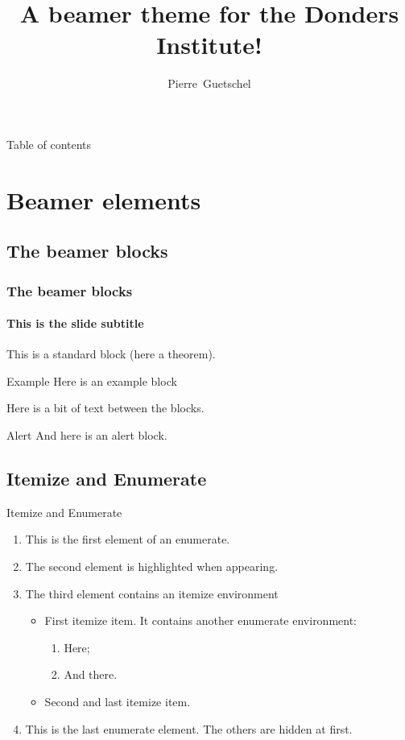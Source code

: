 \documentclass{beamer}
\title[Beamer theme for D.I.]{A beamer theme for the Donders Institute!}
\author[Guetschel]{Pierre~Guetschel}
\institute[Donders Institute]
{ 
	Radboud University, Donders Institute, Nijmegen, Netherlands
}
\begin{document}
\titleframe %

\begin{frame}{Table of contents}
    \tableofcontents
\end{frame}

\section{Beamer elements} 
\sectionframe %

\subsection{The beamer blocks}
\begin{frame} 
	\frametitle{The beamer blocks} 
	\framesubtitle{This is the slide subtitle} 
	\begin{theorem}
		This is a standard block (here a theorem). 
	\end{theorem} 
	\begin{exampleblock}{Example}
		Here is an example block
	\end{exampleblock} 
	Here is a bit of text between the blocks.
	\begin{alertblock}{Alert}
		And here is an alert block.
	\end{alertblock} 
\end{frame}

\subsection{Itemize and Enumerate}
\begin{frame}{Itemize and Enumerate}
	\begin{enumerate} 
	\item<1-> This is the first element of an enumerate.
	\item<2-| alert@2> The second element is highlighted when appearing. 
	\item<3-> The third element contains an itemize environment
	\begin{itemize}
	\item First itemize item. It contains another enumerate environment:
	\begin{enumerate}
	\item Here;
	\item And there.
	\end{enumerate}
	\item Second and last itemize item.
	\end{itemize}
	\item<1-> This is the last enumerate element. The others are hidden at first.
	\end{enumerate}
\end{frame}
\end{document}
